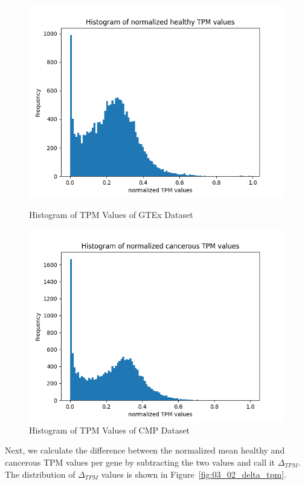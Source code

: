 \begin{figure}[h]
    \includegraphics[width=\linewidth]{figures/03_02_normalized_gtex_tpm}
    \caption{Histogram of TPM Values of GTEx Dataset}
\endminipage
\hfill
{}
  \includegraphics[width=\linewidth]{figures/03_02_normalized_cmp_tpm}
  \caption{Histogram of TPM Values of CMP Dataset}
\endminipage
\label{fig:03_02_normalized_tpm_both}
\end{figure}




Next, we calculate the difference between the normalized mean healthy and cancerous TPM values per gene
by subtracting the two values and call it $\Delta_{TPM}$.
The distribution of $\Delta_{TPM}$ values is shown in Figure~\ref{fig:03_02_delta_tpm}.

